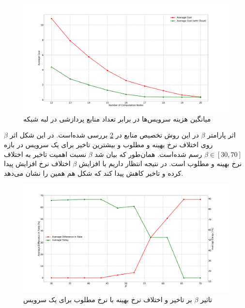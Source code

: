     \begin{figure}[H]
      \centerline{\includegraphics[width=17cm]{graphics/many_to_many/sim_6}}
      \caption{میانگین هزینه سرویس‌ها در برابر تعداد منابع پردازشی در لبه شبکه}
      \label{fig:many_to_many:sim6}
    \end{figure}

    اثر پارامتر $\beta$ در این روش تخصیص منابع در \cref{fig:many_to_many:sim7} بررسی شده‌است.
    در این شکل اثر $\beta$ روی اختلاف نرخ بهینه و مطلوب و بیشترین تاخیر برای یک سرویس در بازه $\beta\in[30, 70]$ رسم شده‌است.
    همان‌طور که بیان شد $\beta$ نسبت اهمیت تاخیر به اختلاف نرخ بهینه و مطلوب است.
    در نتیجه انتظار داریم با افزایش $\beta$ اختلاف نرخ افزایش پیدا کرده و تاخیر کاهش پیدا کند که شکل هم همین را نشان می‌دهد.
    
    \begin{figure}[]
      \centerline{\includegraphics[width=17cm]{graphics/many_to_many/sim_7}}
      \caption{تاثیر $\beta$ بر تاخیر و اختلاف نرخ بهینه با نرخ مطلوب برای یک سرویس}
      \label{fig:many_to_many:sim7}
    \end{figure}

